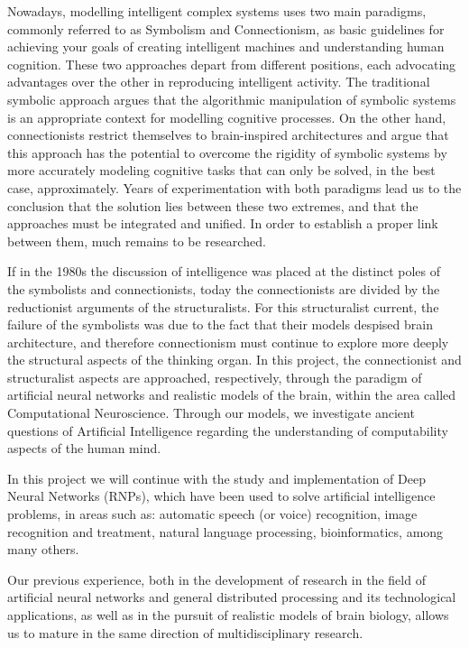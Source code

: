 Nowadays, modelling intelligent complex systems uses two main paradigms, commonly 
referred to as Symbolism and Connectionism, as basic guidelines for achieving your 
goals of creating intelligent machines and understanding human cognition. These 
two approaches depart from different positions, each advocating advantages over 
the other in reproducing intelligent activity. The traditional symbolic approach 
argues that the algorithmic manipulation of symbolic systems is an appropriate context 
for modelling cognitive processes. On the other hand, connectionists restrict themselves 
to brain-inspired architectures and argue that this approach has the potential to 
overcome the rigidity of symbolic systems by more accurately modeling cognitive tasks 
that can only be solved, in the best case, approximately. Years of experimentation 
with both paradigms lead us to the conclusion that the solution lies between these 
two extremes, and that the approaches must be integrated and unified. In order to 
establish a proper link between them, much remains to be researched.

If in the 1980s the discussion of intelligence was placed at the distinct poles 
of the symbolists and connectionists, today the connectionists are divided by the 
reductionist arguments of the structuralists. For this structuralist current, the 
failure of the symbolists was due to the fact that their models despised brain architecture, 
and therefore connectionism must continue to explore more deeply the structural aspects 
of the thinking organ. In this project, the connectionist and structuralist aspects 
are approached, respectively, through the paradigm of artificial neural networks 
and realistic models of the brain, within the area called Computational Neuroscience. 
Through our models, we investigate ancient questions of Artificial Intelligence regarding 
the understanding of computability aspects of the human mind.

In this project we will continue with the study and implementation of Deep Neural 
Networks (RNPs), which have been used to solve artificial intelligence problems, 
in areas such as: automatic speech (or voice) recognition, image recognition and 
treatment, natural language processing, bioinformatics, among many others.

Our previous experience, both in the development of research in the field of artificial 
neural networks and general distributed processing and its technological applications, 
as well as in the pursuit of realistic models of brain biology, allows us to mature 
in the same direction of multidisciplinary research.
